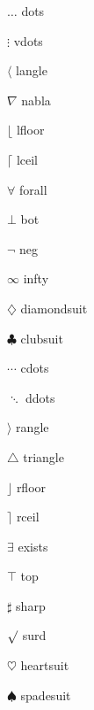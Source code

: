 \documentclass[UTF8]{ctexart}
\begin{document}
\begin{multicols}{2}
$\dots$  dots \par
$\vdots$  vdots \par
$\langle$ langle \par
$\nabla$ nabla \par
$\lfloor$ lfloor \par
$\lceil$ lceil\par
$\forall$ forall\par
$\bot$ bot \par
$\neg$ neg \par
$\infty$ infty \par
$\diamondsuit$ diamondsuit \par
$\clubsuit$ clubsuit \par

$\cdots$  cdots \par
$\ddots$  ddots \par
$\rangle$ rangle \par
$\triangle$ triangle\par
$\rfloor$ rfloor \par
$\rceil$ rceil\par
$\exists$ exists \par
$\top$ top \par
$\sharp$ sharp \par
$\surd$ surd\par
$\heartsuit$ heartsuit\par
$\spadesuit$ spadesuit\par

\end{multicols}
\end{document}
